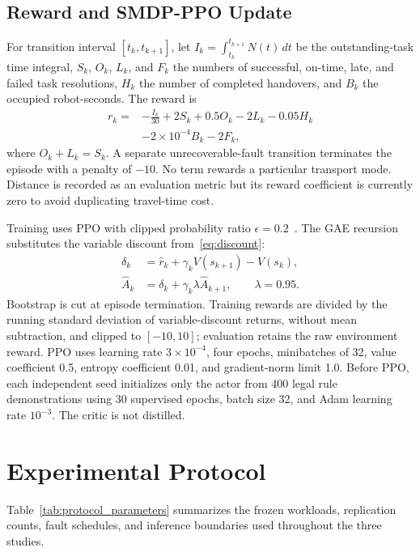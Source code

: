 \documentclass[journal]{IEEEtran}
\begin{document}
\subsection{Reward and SMDP-PPO Update}

For transition interval $[t_k,t_{k+1}]$, let $I_k=\int_{t_k}^{t_{k+1}}N(t)\,dt$ be the outstanding-task time integral, $S_k$, $O_k$, $L_k$, and $F_k$ the numbers of successful, on-time, late, and failed task resolutions, $H_k$ the number of completed handovers, and $B_k$ the occupied robot-seconds. The reward is
\begin{align}
 r_k={}&-\frac{I_k}{30}+2S_k+0.5O_k-2L_k-0.05H_k \nonumber\\
 &-2\times10^{-4}B_k-2F_k,
\label{eq:reward}
\end{align}
where $O_k+L_k=S_k$. A separate unrecoverable-fault transition terminates the episode with a penalty of $-10$. No term rewards a particular transport mode. Distance is recorded as an evaluation metric but its reward coefficient is currently zero to avoid duplicating travel-time cost.

Training uses PPO with clipped probability ratio $\epsilon=0.2$~\cite{schulman2017ppo}. The GAE recursion substitutes the variable discount from~\eqref{eq:discount}:
\begin{align}
 \delta_k &= \hat r_k + \gamma_k V(s_{k+1})-V(s_k),\\
 \hat A_k &= \delta_k+\gamma_k\lambda\hat A_{k+1},\qquad \lambda=0.95.
\end{align}
Bootstrap is cut at episode termination. Training rewards are divided by the running standard deviation of variable-discount returns, without mean subtraction, and clipped to $[-10,10]$; evaluation retains the raw environment reward. PPO uses learning rate $3\times10^{-4}$, four epochs, minibatches of 32, value coefficient 0.5, entropy coefficient 0.01, and gradient-norm limit 1.0. Before PPO, each independent seed initializes only the actor from 400 legal rule demonstrations using 30 supervised epochs, batch size 32, and Adam learning rate $10^{-3}$. The critic is not distilled.

\section{Experimental Protocol}
\label{sec:protocol}

Table~\ref{tab:protocol_parameters} summarizes the frozen workloads, replication counts, fault schedules, and inference boundaries used throughout the three studies.
\end{document}
